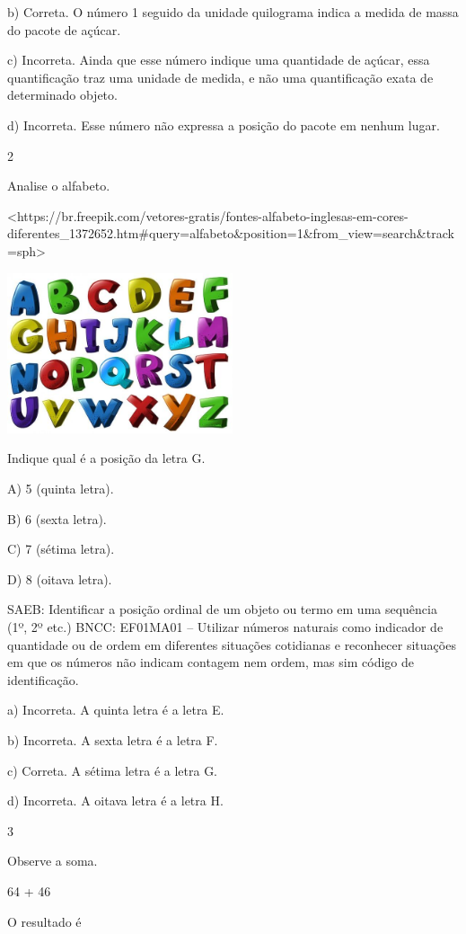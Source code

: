 b) Correta. O número 1 seguido da unidade quilograma indica a medida de
massa do pacote de açúcar.

c) Incorreta. Ainda que esse número indique uma quantidade de açúcar,
essa quantificação traz uma unidade de medida, e não uma
quantificação exata de determinado objeto.

d) Incorreta. Esse número não expressa a posição do pacote em nenhum
lugar.

\num{2}

Analise o alfabeto.

\textless{}https://br.freepik.com/vetores-gratis/fontes-alfabeto-inglesas-em-cores-diferentes\_1372652.htm\#query=alfabeto\&position=1\&from\_view=search\&track=sph\textgreater{}

\includegraphics[width=2.61848in,height=1.85732in]{media/image106.jpg}

Indique qual é a posição da letra G.

A) 5 (quinta letra).

B) 6 (sexta letra).

C) 7 (sétima letra).

D) 8 (oitava letra).

SAEB: Identificar a posição ordinal de um objeto ou termo em uma
sequência (1º, 2º etc.)
BNCC: EF01MA01 -- Utilizar números naturais como indicador de quantidade
ou de ordem em diferentes situações cotidianas e reconhecer situações em
que os números não indicam contagem nem ordem, mas sim código de
identificação.

a) Incorreta. A quinta letra é a letra E.

b) Incorreta. A sexta letra é a letra F.

c) Correta. A sétima letra é a letra G.

d) Incorreta. A oitava letra é a letra H.

\num{3}

Observe a soma.

64 + 46

O resultado é

